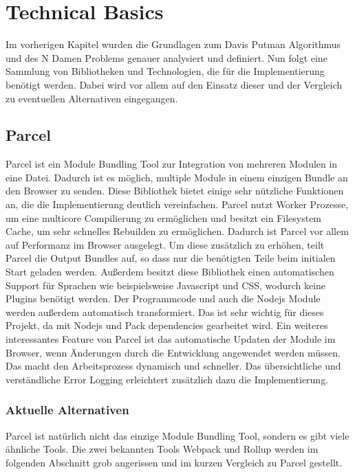 

\chapter{Technical Basics}
Im vorherigen Kapitel wurden die Grundlagen zum Davis Putman Algorithmus und des N Damen Problems genauer analysiert und definiert. Nun folgt eine Sammlung von Bibliotheken und Technologien, die für die Implementierung benötigt werden. Dabei wird vor allem auf den Einsatz dieser und der Vergleich zu eventuellen Alternativen eingegangen. 

\section{Parcel}
Parcel ist ein Module Bundling Tool zur Integration von mehreren Modulen in eine Datei. Dadurch ist es möglich, multiple Module in einem einzigen Bundle an den Browser zu senden. Diese Bibliothek bietet einige sehr nützliche Funktionen an, die die Implementierung deutlich vereinfachen. Parcel nutzt Worker Prozesse, um eine multicore Compilierung zu ermöglichen und besitzt ein Filesystem Cache, um sehr schnelles Rebuilden zu ermöglichen. Dadurch ist Parcel vor allem auf Performanz im Browser ausgelegt. Um diese zusätzlich zu erhöhen, teilt Parcel die Output Bundles auf, so dass nur die benötigten Teile beim initialen Start geladen werden. Außerdem besitzt diese Bibliothek einen automatischen Support für Sprachen wie beispielsweise Javascript und CSS, wodurch keine Plugins benötigt werden. Der Programmcode und auch die Nodejs Module werden außerdem automatisch transformiert. Das ist sehr wichtig für dieses Projekt, da mit Nodejs und Pack dependencies gearbeitet wird. Ein weiteres interessantes Feature von Parcel ist das automatische Updaten der Module im Browser, wenn Änderungen durch die Entwicklung angewendet werden müssen. Das macht den Arbeitsprozess dynamisch und schneller. Das übersichtliche und verständliche Error Logging erleichtert zusätzlich dazu die Implementierung. 
\subsection{Aktuelle Alternativen}
Parcel ist natürlich nicht das einzige Module Bundling Tool, sondern es gibt viele ähnliche Tools. Die zwei bekannten Tools Webpack und Rollup werden im folgenden Abschnitt grob angerissen und im kurzen Vergleich zu Parcel gestellt.
